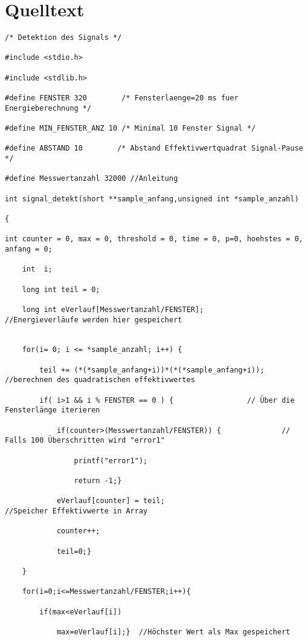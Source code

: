 \documentclass[a4paper,12pt]{article}
\begin{document}
\newpage
\section{Quelltext}
\begin{lstlisting}[caption={detection.c}]
/* Detektion des Signals */

#include <stdio.h>

#include <stdlib.h>

#define FENSTER 320        /* Fensterlaenge=20 ms fuer Energieberechnung */

#define MIN_FENSTER_ANZ 10 /* Minimal 10 Fenster Signal */

#define ABSTAND 10        /* Abstand Effektivwertquadrat Signal-Pause */

#define Messwertanzahl 32000 //Anleitung

int signal_detekt(short **sample_anfang,unsigned int *sample_anzahl)

{

int counter = 0, max = 0, threshold = 0, time = 0, p=0, hoehstes = 0, anfang = 0;

	int  i;

	long int teil = 0;

	long int eVerlauf[Messwertanzahl/FENSTER];            //Energieverläufe werden hier gespeichert


	for(i= 0; i <= *sample_anzahl; i++) {

		teil += (*(*sample_anfang+i))*(*(*sample_anfang+i));        //berechnen des quadratischen effektivwertes

		if( i>1 && i % FENSTER == 0 ) {				    // Über die Fensterlänge iterieren 		

			if(counter>(Messwertanzahl/FENSTER)) {              // Falls 100 Überschritten wird "error1" 

				printf("error1");                                   

				return -1;}

			eVerlauf[counter] = teil;                           //Speicher Effektivwerte in Array

			counter++;

			teil=0;}

	}

	for(i=0;i<=Messwertanzahl/FENSTER;i++){

		if(max<eVerlauf[i])   

			max=eVerlauf[i];}  //Höchster Wert als Max gespeichert






\end{lstlisting}
\end{document}
